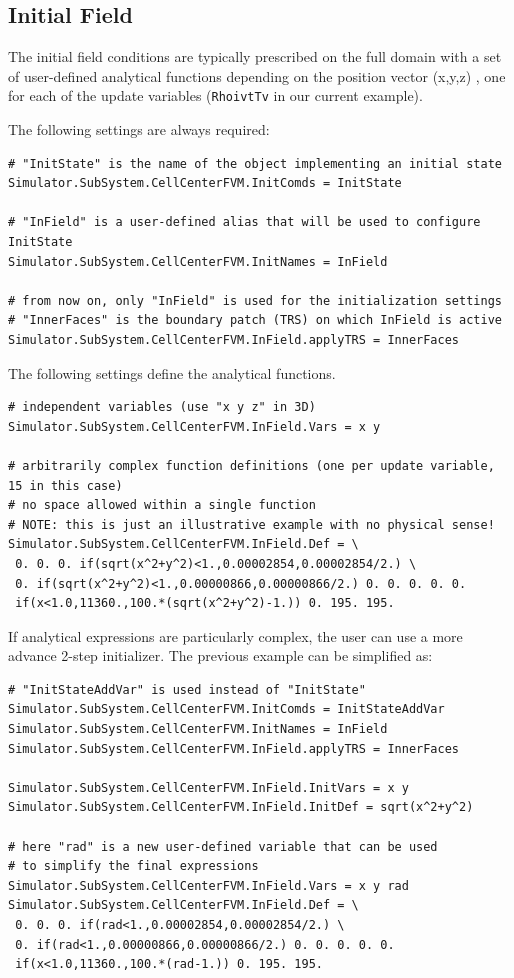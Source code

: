 \documentclass[11pt]{article}
\begin{document}
\subsection{Initial Field}

The initial field conditions are typically prescribed on the full domain with a set of 
user-defined analytical functions depending on the position vector (x,y,z) \cite{FParser}, 
one for each of the update variables ({\tt RhoivtTv} in our current example). 

The following settings are always required:
\begin{verbatim}
# "InitState" is the name of the object implementing an initial state 
Simulator.SubSystem.CellCenterFVM.InitComds = InitState

# "InField" is a user-defined alias that will be used to configure InitState
Simulator.SubSystem.CellCenterFVM.InitNames = InField

# from now on, only "InField" is used for the initialization settings
# "InnerFaces" is the boundary patch (TRS) on which InField is active
Simulator.SubSystem.CellCenterFVM.InField.applyTRS = InnerFaces
\end{verbatim}

The following settings define the analytical functions.
\begin{verbatim} 
# independent variables (use "x y z" in 3D)
Simulator.SubSystem.CellCenterFVM.InField.Vars = x y  

# arbitrarily complex function definitions (one per update variable, 15 in this case)
# no space allowed within a single function
# NOTE: this is just an illustrative example with no physical sense!
Simulator.SubSystem.CellCenterFVM.InField.Def = \
 0. 0. 0. if(sqrt(x^2+y^2)<1.,0.00002854,0.00002854/2.) \
 0. if(sqrt(x^2+y^2)<1.,0.00000866,0.00000866/2.) 0. 0. 0. 0. 0. 
 if(x<1.0,11360.,100.*(sqrt(x^2+y^2)-1.)) 0. 195. 195.
\end{verbatim}

If analytical expressions are particularly complex, the user can use a more advance
2-step initializer. The previous example can be simplified as:

\begin{verbatim}
# "InitStateAddVar" is used instead of "InitState"
Simulator.SubSystem.CellCenterFVM.InitComds = InitStateAddVar
Simulator.SubSystem.CellCenterFVM.InitNames = InField
Simulator.SubSystem.CellCenterFVM.InField.applyTRS = InnerFaces

Simulator.SubSystem.CellCenterFVM.InField.InitVars = x y
Simulator.SubSystem.CellCenterFVM.InField.InitDef = sqrt(x^2+y^2)

# here "rad" is a new user-defined variable that can be used 
# to simplify the final expressions 
Simulator.SubSystem.CellCenterFVM.InField.Vars = x y rad
Simulator.SubSystem.CellCenterFVM.InField.Def = \
 0. 0. 0. if(rad<1.,0.00002854,0.00002854/2.) \
 0. if(rad<1.,0.00000866,0.00000866/2.) 0. 0. 0. 0. 0. 
 if(x<1.0,11360.,100.*(rad-1.)) 0. 195. 195.
\end{verbatim}
\end{document}
